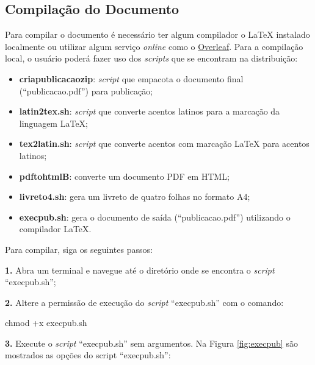 \subsection{Compilação do Documento}
\label{sec:compilacao}

Para compilar o documento é necessário ter algum compilador o LaTeX instalado localmente ou utilizar algum serviço \textit{online} como o \href{https://www.overleaf.com/}{Overleaf}. Para a compilação local, o usuário poderá fazer uso dos \textit{scripts} que se encontram na distribuição:

\begin{itemize}
    \item \textbf{criapublicacaozip}: \textit{script} que empacota o documento final (``publicacao.pdf'') para publicação;
    \item \textbf{latin2tex.sh}: \textit{script} que converte acentos latinos para a marcação da linguagem LaTeX;
    \item \textbf{tex2latin.sh}: \textit{script} que converte acentos com marcação LaTeX para acentos latinos;
    \item \textbf{pdftohtmlB}: converte um documento PDF em HTML;
    \item \textbf{livreto4.sh}: gera um livreto de quatro folhas no formato A4;
    \item \textbf{execpub.sh}: gera o documento de saída (``publicacao.pdf'') utilizando o compilador LaTeX. 
\end{itemize}

Para compilar, siga os seguintes passos:

\textbf{1.} Abra um terminal e navegue até o diretório onde se encontra o \textit{script} ``execpub.sh'';

\textbf{2.} Altere a permissão de execução do \textit{script} ``execpub.sh'' com o comando:
\begin{commandshell}
chmod +x execpub.sh
\end{commandshell}

\textbf{3.} Execute o \textit{script} ``execpub.sh'' sem argumentos. Na Figura \ref{fig:execpub} são mostrados as opções do script ``execpub.sh'': 

